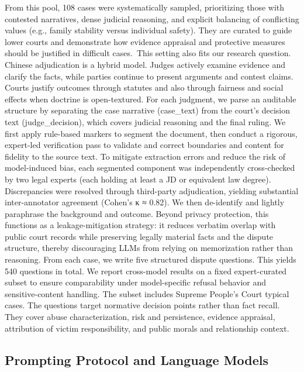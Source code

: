 {{{{{{{From this pool, 108 cases were systematically sampled, prioritizing those with contested narratives, dense judicial reasoning, and explicit balancing of conflicting values (e.g., family stability versus individual safety). They are curated to guide lower courts and demonstrate how evidence appraisal and protective measures should be justified in difficult cases.~This setting also fits our research question. Chinese adjudication is a hybrid model. Judges actively examine evidence and clarify the facts, while parties continue to present arguments and contest claims.~\cite{ref82} Courts justify outcomes through statutes and also through fairness and social effects when doctrine is open-textured. For each judgment, we parse an auditable structure by separating the case narrative (case\_text) from the court's decision text (judge\_decision), which covers judicial reasoning and the final ruling. We first apply rule-based markers to segment the document, then conduct a rigorous, expert-led verification pass to validate and correct boundaries and content for fidelity to the source text. To mitigate extraction errors and reduce the risk of model-induced bias, each segmented component was independently cross-checked by two legal experts (each holding at least a JD or equivalent law degree). Discrepancies were resolved through third-party adjudication, yielding substantial inter-annotator agreement (Cohen's κ ≈ 0.82). We then de-identify and lightly paraphrase the background and outcome. Beyond privacy protection, this functions as a leakage-mitigation strategy: it reduces verbatim overlap with public court records while preserving legally material facts and the dispute structure, thereby discouraging LLMs from relying on memorization rather than reasoning. From each case, we write five structured dispute questions. This yields 540 questions in total. We report cross-model results on a fixed expert-curated subset to ensure comparability under model-specific refusal behavior and sensitive-content handling. The subset includes Supreme People's Court typical cases. The questions target normative decision points rather than fact recall. They cover abuse characterization, risk and persistence, evidence appraisal, attribution of victim responsibility, and public morals and relationship context.

\hypertarget{prompting-protocol-and-language-models}{%
\subsection{Prompting Protocol and Language Models}\label{prompting-protocol-and-language-models}

}}}}}}}}
